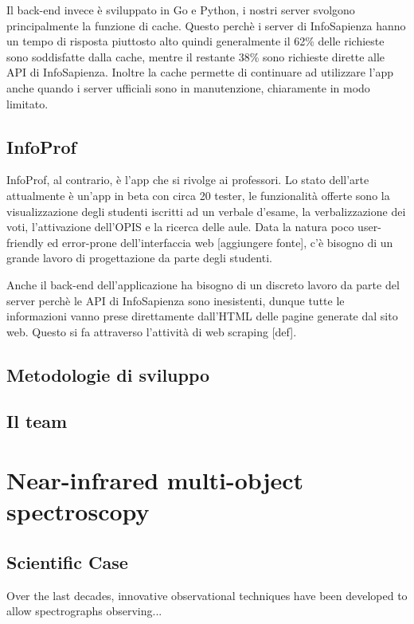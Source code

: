 \documentclass[Lau, oneside]{sapthesis}%
\begin{document}
Il back-end invece è sviluppato in Go e Python, i nostri server svolgono principalmente la funzione di cache. Questo perchè i server di InfoSapienza hanno un tempo di risposta piuttosto alto quindi generalmente il 62\% delle richieste sono soddisfatte dalla cache, mentre il restante 38\% sono richieste dirette alle API di InfoSapienza. Inoltre la cache permette di continuare ad utilizzare l'app anche quando i server ufficiali sono in manutenzione, chiaramente in modo limitato.
\section{InfoProf}
InfoProf, al contrario, è l'app che si rivolge ai professori. Lo stato dell'arte attualmente è un'app in beta con circa 20 tester, le funzionalità offerte sono la visualizzazione degli studenti iscritti ad un verbale d'esame, la verbalizzazione dei voti, l'attivazione dell'OPIS e la ricerca delle aule. Data la natura poco user-friendly ed error-prone dell'interfaccia web [aggiungere fonte], c'è bisogno di un grande lavoro di progettazione da parte degli studenti.

Anche il back-end dell'applicazione ha bisogno di un discreto lavoro da parte del server perchè le API di InfoSapienza sono inesistenti, dunque tutte le informazioni vanno prese direttamente dall'HTML delle pagine generate dal sito web. Questo si fa attraverso l'attività di web scraping [def].
\section{Metodologie di sviluppo}
\section{Il team}


\chapter{Near-infrared multi-object spectroscopy}
\label{chap:1} 
\section{Scientific Case}
\label{sec:caso}
Over the last decades, innovative observational techniques have been developed to allow spectrographs observing...
\end{document}
